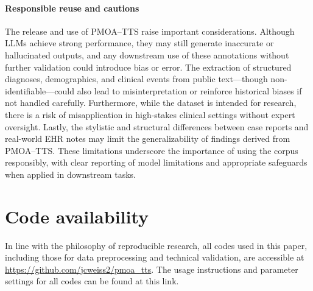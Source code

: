 \documentclass[pdflatex,sn-mathphys-num]{sn-jnl}%
\theoremstyle{thmstyleone}%
\theoremstyle{thmstyletwo}%
\theoremstyle{thmstylethree}%
\begin{document}
\paragraph{Responsible reuse and cautions}

The release and use of PMOA–TTS raise important considerations. Although LLMs achieve strong performance, they may still generate inaccurate or hallucinated outputs, and any downstream use of these annotations without further validation could introduce bias or error. The extraction of structured diagnoses, demographics, and clinical events from public text—though non-identifiable—could also lead to misinterpretation or reinforce historical biases if not handled carefully. Furthermore, while the dataset is intended for research, there is a risk of misapplication in high-stakes clinical settings without expert oversight. Lastly, the stylistic and structural differences between case reports and real-world EHR notes may limit the generalizability of findings derived from PMOA–TTS. These limitations underscore the importance of using the corpus responsibly, with clear reporting of model limitations and appropriate safeguards when applied in downstream tasks.


\section*{Code availability}\label{sec:data_availability}
In line with the philosophy of reproducible research, all codes used in this paper, including those for data preprocessing and technical validation, are accessible at \url{https://github.com/jcweiss2/pmoa_tts}. The usage instructions and parameter settings for all codes can be found at this link.


\end{document}
